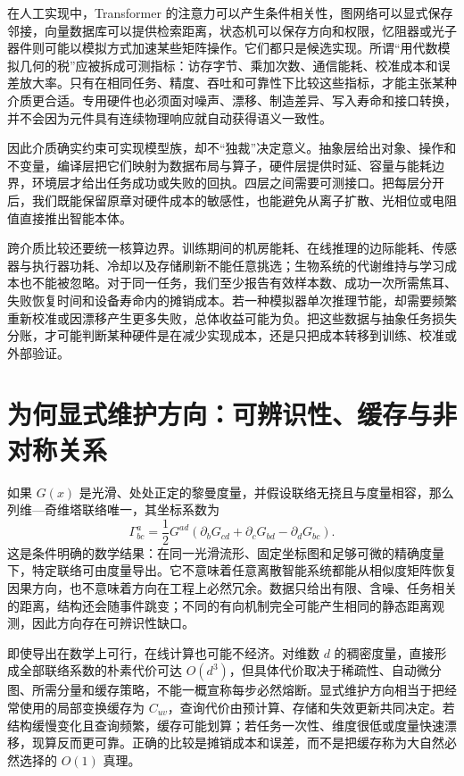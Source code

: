 在人工实现中，Transformer 的注意力可以产生条件相关性，图网络可以显式保存邻接，向量数据库可以提供检索距离，状态机可以保存方向和权限，忆阻器或光子器件则可能以模拟方式加速某些矩阵操作。它们都只是候选实现。所谓“用代数模拟几何的税”应被拆成可测指标：访存字节、乘加次数、通信能耗、校准成本和误差放大率。只有在相同任务、精度、吞吐和可靠性下比较这些指标，才能主张某种介质更合适。专用硬件也必须面对噪声、漂移、制造差异、写入寿命和接口转换，并不会因为元件具有连续物理响应就自动获得语义一致性。

因此介质确实约束可实现模型族，却不“独裁”决定意义。抽象层给出对象、操作和不变量，编译层把它们映射为数据布局与算子，硬件层提供时延、容量与能耗边界，环境层才给出任务成功或失败的回执。四层之间需要可测接口。把每层分开后，我们既能保留原章对硬件成本的敏感性，也能避免从离子扩散、光相位或电阻值直接推出智能本体。

跨介质比较还要统一核算边界。训练期间的机房能耗、在线推理的边际能耗、传感器与执行器功耗、冷却以及存储刷新不能任意挑选；生物系统的代谢维持与学习成本也不能被忽略。对于同一任务，我们至少报告有效样本数、成功一次所需焦耳、失败恢复时间和设备寿命内的摊销成本。若一种模拟器单次推理节能，却需要频繁重新校准或因漂移产生更多失败，总体收益可能为负。把这些数据与抽象任务损失分账，才可能判断某种硬件是在减少实现成本，还是只把成本转移到训练、校准或外部验证。

\section{为何显式维护方向：可辨识性、缓存与非对称关系}
\label{sec:illusion_of_riemannian_theorem_final}

如果 $G(x)$ 是光滑、处处正定的黎曼度量，并假设联络无挠且与度量相容，那么列维—奇维塔联络唯一，其坐标系数为
\[
\Gamma^{a}_{bc}=\frac12G^{ad}(\partial_bG_{cd}+\partial_cG_{bd}-\partial_dG_{bc}).
\]
这是条件明确的数学结果：在同一光滑流形、固定坐标图和足够可微的精确度量下，特定联络可由度量导出。它不意味着任意离散智能系统都能从相似度矩阵恢复因果方向，也不意味着方向在工程上必然冗余。数据只给出有限、含噪、任务相关的距离，结构还会随事件跳变；不同的有向机制完全可能产生相同的静态距离观测，因此方向存在可辨识性缺口。

即使导出在数学上可行，在线计算也可能不经济。对维数 $d$ 的稠密度量，直接形成全部联络系数的朴素代价可达 $O(d^3)$，但具体代价取决于稀疏性、自动微分图、所需分量和缓存策略，不能一概宣称每步必然熔断。显式维护方向相当于把经常使用的局部变换缓存为 $C_{uv}$，查询代价由预计算、存储和失效更新共同决定。若结构缓慢变化且查询频繁，缓存可能划算；若任务一次性、维度很低或度量快速漂移，现算反而更可靠。正确的比较是摊销成本和误差，而不是把缓存称为大自然必然选择的 $O(1)$ 真理。


